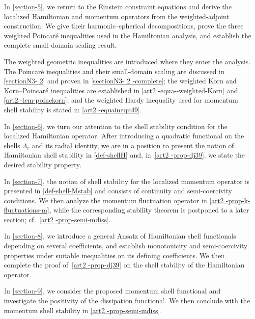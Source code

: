 \documentclass[11pt]{article}
\numberwithin{table}{section}
\numberwithin{equation}{section}
\numberwithin{table}{section}
\numberwithin{figure}{section}
\begin{document}
\item In \autoref{section-5}, we return to the Einstein constraint equations and derive the localized Hamiltonian and momentum operators from the weighted-adjoint construction.  We give their harmonic--spherical decompositions, prove the three weighted Poincar\'e inequalities used in the Hamiltonian analysis, and establish the complete small-domain scaling result.

\item The weighted geometric inequalities are introduced where they enter the analysis.  The Poincar\'e inequalities and their small-domain scaling are discussed in \autoref{sectionN3- 2} and proven in \autoref{sectionN3- 2 -complete}; the weighted Korn and Korn--Poincar\'e inequalities are established in \autoref{art2 -equa--weighted-Korn} and \autoref{art2 -lem-poinckorn}; and the weighted Hardy inequality used for momentum shell stability is stated in \autoref{art2 -equainequ49}.

\item In \autoref{section-6}, we turn our attention to the shell stability condition for the localized Hamiltonian operator. After introducing a quadratic functional on the shells $\Lambda_r$ and its radial identity, we are in a position to present the notion of Hamiltonian shell stability in \autoref{def-shellH} and, in~\autoref{art2 -prop-dj39}, we state the desired stability property. 

\item In \autoref{section-7}, the notion of shell stability for the localized momentum operator is presented in \autoref{def-shell-Mstab} and consists of continuity and semi-coercivity conditions. We then analyze the momentum fluctuation operator in \autoref{art2 -prop-k-fluctuations-m}, while the corresponding stability theorem is postponed to a later section; cf.~\autoref{art2 -prop-semi-mdiss}.

\item In \autoref{section-8}, we introduce a general Ansatz of Hamiltonian shell functionals depending on several coefficients, and establish monotonicity and semi-coercivity properties under suitable inequalities on its defining coefficients. We then complete the proof of~\autoref{art2 -prop-dj39} on the shell stability of the Hamiltonian operator. 

\item In \autoref{section-9}, we consider the proposed momentum shell functional and investigate the positivity of the dissipation functional. We then conclude with the momentum shell stability in \autoref{art2 -prop-semi-mdiss}. 
\end{document}

